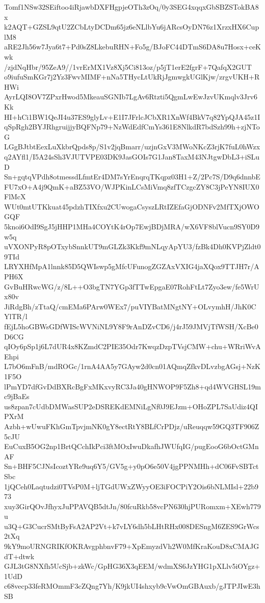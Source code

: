 Tomf1NSw32SEiftoo4iRjawbDXFHgpjeOTh3zOq/0y3SEG4xqqxGbSBZSTokBA8x
k2AQT+GZSL9qtU2ZCbLtyDCDm65jz6eNLlbYu6jARcsOyDN76z1XrzxHX6CuplM8
aRE2Jh56w7Jya6t7+Pd0sZ8LkebuRHN+Fo5g/BJoFC44DTmS6DA8u7Hosx+ceKwk
/zjdNqHbr/95ZeA9//1vrErMX1Vz8Xj5Ci813oz/p5jT1erE2fgrF+7QafqX2GUT
o9iufuSmKGr7j2Yz3FwvMIMF+nNa5THycLtUkRjJgmwgkUGlKjw/zrgvUKH+RHWi
AyrLQI8OV7ZPxrHwod5MkeauSGNIb7LgAv6Rtzti5QgmLwEwJzvUKmqlv3Jrv6Kk
HI+hCi1BW1QeJI4u37ES9glyLv+E1I7JFrlcJCbXR1XnWf4BkV7q82YpQJA45z1I
qSpRgh2BYJRhgruijjyBQFNp79+NzWdEdfCmYs361E8NlkdR7bdSzh99h+zjNToG
LGgBJtbtEexLuXkbrQpds8p/S1v2jqBmarr/uzjnGxV3MWoNKcZ3rjK7fuL0hWzx
q2AYfl1/I5A24sSh3VJUTVPE03DK9JasGOIs7G1Jan8TaxM43NJtgwDbL3+iSLuD
Sn+gqtqVPdh8otmessdLfmtEr4DM7sYrEnqrqTKqpz03H1+Z/2Pc7S/D9q6dnnbE
FU7xO+A4j9QmK+aBZ53VO/WJPKinLCsMiVmq8zfTCzgcZY8C3jPeYN8IUX0FlMcX
WUt0mtUTKkuat45pdzhTIXfxu2CUwogaCsyszLRtIZEfaGjODNFv2MfTXjOWOGQF
5knoi6OdI9SgJ5jHHP1MHa4COYtK4rOp7EwjBDjMRA/wX6VF8blVucn9SY0D9w5q
uVXONPyR8pOTxybSnnkUT9mGLZk3Kkf9mNLqyApYU3/fzBk4Dh0KVPjZldt09TId
LRYXHfMpA1lnnk85D5QWIswp5gMfcUFunogZGZAxVXIG4jaXQox9TTJH7r/APH6X
GvBuHRwcWG/z/8L++O3bgTN7YGp3fTTwEpgaE07RohFtLt7Zyo3ew/fe5WrUx80v
JiRdgBh/zTtaQ/cmEMa6PArw0WEx7/puVIYBatMNgtNY+OLvymhH/JhK0CYlTR/l
fEjL5hoGBWsGDfWIScWVNiNL9Y8F9rAnDZvCD6/j4rJ59JMVjTfWSH/XcBe0D6CG
qIOy6pSp1j6L7dUR4x8KZmdC2PIE35Odr7KwqzDzpTVsjCMW+chu+WRriWvAEhpi
L7bO6mFnB/mdROGc/1rnA4AA5y7GAyw2d0cn01AQmqZfkvDLvzbgAGsj+NzK1F5O
lPmYD7dfGvDdBXRcBgFxMKxvyRC3Ja40gHNWOP9F5Zh8+qd4WVGHSL19mc9jBaEs
us8zpan7cUdbDMWasSUP2eDSREKdEMNiLgNf0J9EJzm+OHoZPL7SaUdiz4QIPXrM
Azbh+wUwuFKhGmTpvjmNK0gY8ectRtY8BLfCrPDjz/uReuqqw59GQ3TF906Z5cJU
EuCuxB5OG2np1BrtQCchIkPci3ftMOxIwuDkafhJWUfqIG/pugEooG6bOctGMnAF
Sn+BHF5CJNsIcoztYRe9uq6Y5/GV5g+y0pO6e50V4jgPPNMHh+dC06FvSBTctSbc
1jQCeh0Laqtudzi0TVsP0M+ljTGdUWxZWyyOE3iFOCPiY2Ois6bNLMIsl+22b973
xuy3GirQOvJfhyxJuPPAVQB5dtJn/80fcuRkb58vcPN630hjPURomxm+XEwh779u
u3Q+G3CucrSMtByFsA2AP2Vt+k7vLY6dh5bLHtRHx008DESngM6ZES9GrWcs2tXq
9kY9moURNGRIKfOKRAvgphbnvF79+XpEmyzdVh2W0MfKraKouD8xCMAJGdT+dtwk
GJL3tG8NXfh5UcSjb+zkWc/GpHG36X3qEEM/wdmXS6JzYHG1pXLlv5iOYgz+1UdD
c68vecp33feRMOmmF3cZQng7Yh/K9jkUI4shxyb9cVwOmGBAuxb/gJTPJIwE3hSB
